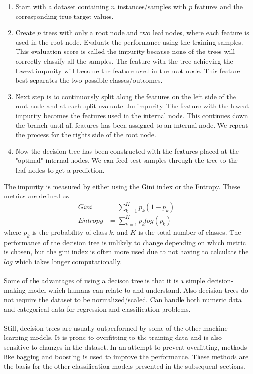 \documentclass[a4paper,twocolumn]{article}
\begin{document}
\begin{enumerate}
    \item Start with a dataset containing $n$ instances/samples with $p$ features and the corresponding true target values.
    \item Create $p$ trees with only a root node and two leaf nodes, where each feature is used in the root node. Evaluate the performance using the training samples. This evaluation score is called the impurity because none of the trees will correctly classify all the samples. The feature with the tree achieving the lowest impurity will become the feature used in the root node. This feature best separates the two possible classes/outcomes.
    \item Next step is to continuously split along the features on the left side of the root node and at each split evaluate the impurity. The feature with the lowest impurity becomes the features used in the internal node. This continues down the branch until all features has been assigned to an internal node. We repeat the process for the rights side of the root node.
    \item Now the decision tree has been constructed with the features placed at the "optimal" internal nodes. We can feed test samples through the tree to the leaf nodes to get a prediction.
\end{enumerate}
The impurity is measured by either using the Gini index or the Entropy. These metrics are defined as
\begin{align}
    Gini &= \sum_{k = 1}^{K} p_{k}(1 - p_{k})\\
    Entropy &= \sum_{k = 1}^{K} p_{k} log(p_{k})
\end{align}
where $p_{k}$ is the probability of class $k$, and $K$ is the total number of classes. The performance of the decision tree is unlikely to change depending on which metric is chosen, but the gini index is often more used due to not having to calculate the $log$ which takes longer computationally.\\
\\
Some of the advantages of using a decison tree is that it is a simple decision-making model which humans can relate to and understand. Also decision trees do not require the dataset to be normalized/scaled. Can handle both numeric data and categorical data for regression and classification problems.\\
\\
Still, decision trees are usually outperformed by some of the other machine learning models. It is prone to overfitting to the training data and is also sensitive to changes in the dataset. In an attempt to prevent overfitting, methods like bagging and boosting is used to improve the performance. These methods are the basis for the other classification models presented in the subsequent sections.
\end{document}

